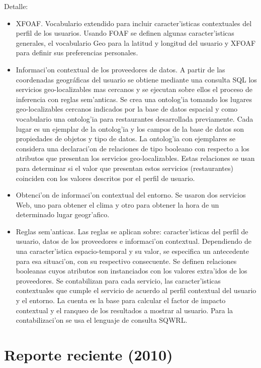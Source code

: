 \documentclass[11pt]{article}
\begin{document}
Detalle:
\begin{itemize}
\item XFOAF. Vocabulario extendido para incluir caracter'isticas contextuales del perfil de los usuarios. Usando FOAF se definen algunas caracter'isticas generales, el vocabulario Geo para la latitud y longitud del usuario y XFOAF para definir sus preferencias personales.
\item Informaci'on contextual de los proveedores de datos. A partir de las coordenadas geográficas del usuario se obtiene mediante una consulta SQL los servicios geo-localizables mas cercanos y se ejecutan sobre ellos el proceso de inferencia con reglas sem'anticas. Se crea una ontolog'ia tomando los lugares geo-localizables cercanos indicados por la base de datos espacial y como vocabulario una ontolog'ia para restaurantes desarrollada previamente. Cada lugar es un ejemplar de la ontolog'ia y los campos de la base de datos son propiedades de objetos y tipo de datos. La ontolog'ia con ejemplares se considera una declaraci'on de relaciones de tipo booleano con respecto a los atributos que presentan los servicios geo-localizables. Estas relaciones se usan para determinar si el valor que presentan estos servicios (restaurantes) coinciden con los valores descritos por el perfil de usuario.
\item Obtenci'on de informaci'on contextual del entorno. Se usaron dos servicios Web, uno para obtener el clima y otro para obtener la hora de un determinado lugar geogr'afico.
\item Reglas sem'anticas. Las reglas se aplican sobre: caracter'isticas del perfil de usuario, datos de los proveedores e informaci'on contextual. Dependiendo de una caracter'istica espacio-temporal y su valor, se especifica un antecedente para esa situaci'on, con su respectivo consecuente. Se definen relaciones booleanas cuyos atributos son instanciados con los valores extra'idos de los proveedores. Se contabilizan para cada servicio, las caracter'isticas contextuales que cumple el servicio de acuerdo al perfil contextual del usuario y el entorno. La cuenta es la base para calcular el factor de impacto contextual y el ranqueo de los resultados a mostrar al usuario. Para la contabilizaci'on se usa el lenguaje de consulta SQWRL.
\end{itemize}

\section{Reporte reciente (2010)}
\end{document}
